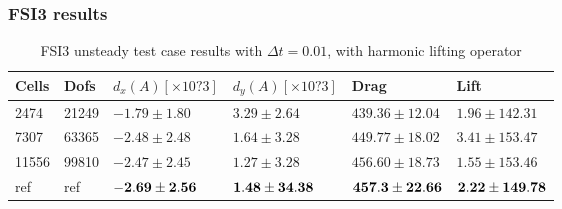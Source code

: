 \subsubsection*{FSI3 results}
\begin{table}[H]
\centering
\caption{FSI3 unsteady test case results with $\Delta t = 0.01$, with harmonic lifting operator}
\label{my-label}
\begin{tabular}{|l|l|l|l|l|l|}
\hline
Cells & Dofs & $d_x (A)[\times10?3 ]$ & $d_y (A)[\times10?3 ]$ & Drag & Lift \\ \hline
2474 & 21249 & $-1.79 \pm 1.80$ & $3.29 \pm 2.64$ & $439.36 \pm 12.04$ & $1.96 \pm 142.31$ \\ \hline
7307 & 63365 & $-2.48 \pm 2.48$ & $ 1.64 \pm 3.28$ & $449.77 \pm 18.02$ & $3.41 \pm 153.47$ \\ \hline
11556 & 99810 & $ -2.47 \pm 2.45$ & $ 1.27 \pm 3.28$ & $456.60 \pm 18.73$ & $1.55 \pm 153.46$ \\ \hline
ref & ref & $\bold{-2.69 \pm  2.56}$ & $\bold{1.48 \pm 34.38}$ & $\bold{457.3 \pm 22.66}$ & $\bold{2.22 \pm 149.78}$ \\ \hline
\end{tabular}
\end{table}

